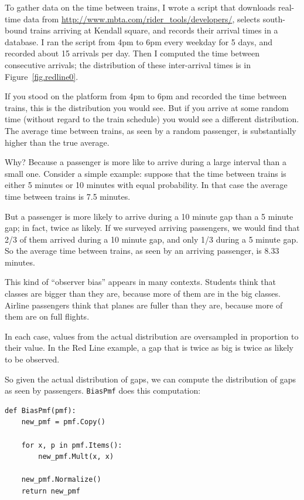 \documentclass[12pt]{book}
\begin{document}
To gather data on the time between trains, I wrote a script that
downloads real-time data from
\url{http://www.mbta.com/rider_tools/developers/}, selects south-bound
trains arriving at Kendall square, and records their arrival times
in a database.  I ran the script from 4pm to 6pm every weekday
for 5 days, and recorded about 15 arrivals per day.  Then
I computed the time between consecutive arrivals; the distribution
of these inter-arrival times is in Figure~\ref{fig.redline0}.

If you stood on the platform from 4pm to 6pm and recorded the time
between trains, this is the distribution you would see.  But if you
arrive at some random time (without regard to the train schedule) you
would see a different distribution.  The average time
between trains, as seen by a random passenger, is substantially
higher than the true average.

Why?  Because a passenger is more like to arrive during a
large interval than a small one.  Consider a simple example:
suppose that the time between trains is either 5 minutes
or 10 minutes with equal probability.  In that case
the average time between
trains is 7.5 minutes.

But a passenger is more likely to arrive during a 10 minute gap 
than a 5 minute gap; in fact, twice as likely.  If we surveyed
arriving passengers, we would find that 2/3 of them arrived during
a 10 minute gap, and only 1/3 during a 5 minute gap.  So the
average time between trains, as seen by an arriving passenger,
is 8.33 minutes.

This kind of ``observer bias'' appears in many contexts.  Students
think that classes are bigger than they are, because more of them are
in the big classes.  Airline passengers think that planes are fuller
than they are, because more of them are on full flights.

In each case, values from the actual distribution are
oversampled in proportion to their value.  In the Red Line example,
a gap that is twice as big is twice as likely to be observed.

So given the actual distribution of gaps, we can compute the
distribution of gaps as seen by passengers.  {\tt BiasPmf}
does this computation:

\begin{verbatim}
def BiasPmf(pmf):
    new_pmf = pmf.Copy()

    for x, p in pmf.Items():
        new_pmf.Mult(x, x)
        
    new_pmf.Normalize()
    return new_pmf
\end{verbatim}
\end{document}
